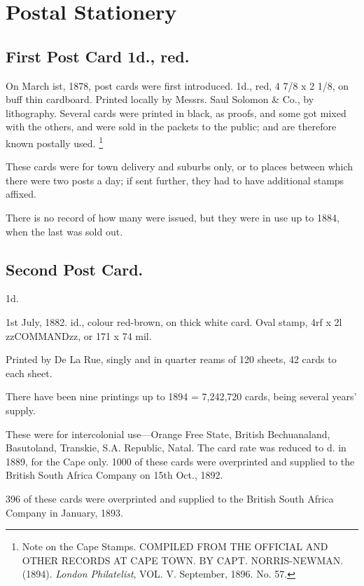 \chapter{Postal Stationery}

\section{First Post Card 1d., red.}

On March ist, 1878, post cards were first introduced.
1d., red, 4 7/8 x 2 1/8, on buff thin cardboard.
Printed locally by Messrs. Saul Solomon \& Co., by lithography.
Several cards were printed in black, as proofs, and some got mixed with
the others, and were sold in the packets to the public; and are therefore
known postally used. \footnote{Note on the Cape Stamps.
COMPILED FROM THE OFFICIAL AND OTHER RECORDS AT CAPE TOWN. BY CAPT. NORRIS-NEWMAN.
(1894). \textit{London Philatelist}, VOL. V. September, 1896. No. 57. }

These cards were for town delivery and suburbs only, or to places
between which there were two posts a day; if sent further, they had to
have additional stamps affixed. 


There is no record of how many were
issued, but they were in use up to 1884, when the last was sold out.

\section{Second Post Card.}

1d.

1st July, 1882. id., colour red-brown, on thick white card. Oval stamp,
4rf x 2l  zzCOMMANDzz, or 171 x 74 mil.

Printed by De La Rue, singly and in quarter reams of 120 sheets, 42
cards to each sheet.

There have been nine printings up to 1894  = 7,242,720 cards, being
several years' supply.

These were for intercolonial use---Orange Free State, British Bechuanaland,
Basutoland, Transkie, S.A. Republic, Natal. The card rate was
reduced to \half d. in 1889, for the Cape only.
1000 of these cards were overprinted and supplied to the British South Africa
Company on 15th Oct., 1892.

396 of these cards were overprinted and supplied to the British South Africa
Company in January, 1893.

